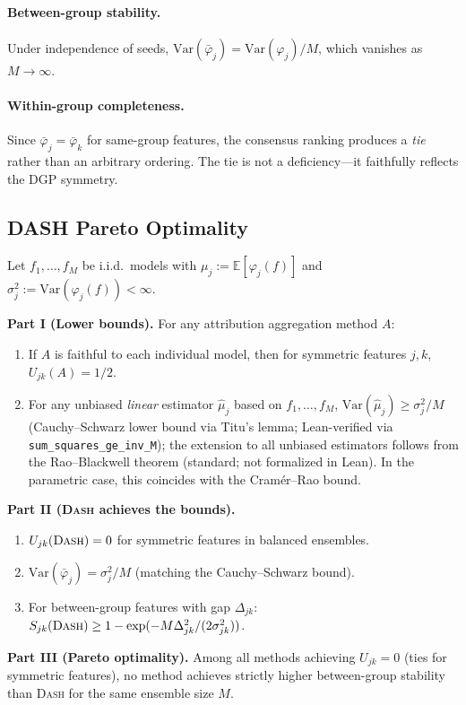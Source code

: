 \documentclass{jmlr}
\newcommand{\E}{\mathbb{E}}
\newcommand{\Var}{\mathrm{Var}}
\newcommand{\DASH}{\textsc{Dash}}
\begin{document}
\paragraph{Between-group stability.}
Under independence of seeds, $\Var(\bar{\varphi}_j) = \Var(\varphi_j) / M$, which vanishes as $M \to \infty$.

\paragraph{Within-group completeness.}
Since $\bar{\varphi}_j = \bar{\varphi}_k$ for same-group features, the consensus ranking produces a \emph{tie} rather than an arbitrary ordering. The tie is not a deficiency---it faithfully reflects the DGP symmetry.

\subsection{DASH Pareto Optimality}
\label{sec:dash-pareto}

\begin{theorem}
\label{thm:dash-optimal}
Let $f_1, \ldots, f_M$ be i.i.d.\ models with $\mu_j := \E[\varphi_j(f)]$ and $\sigma_j^2 := \Var(\varphi_j(f)) < \infty$.

\textbf{Part I (Lower bounds).}
For any attribution aggregation method $A$:
\begin{enumerate}
    \item[(a)] If $A$ is faithful to each individual model, then for symmetric features $j, k$, $U_{jk}(A) = 1/2$.
    \item[(b)] For any unbiased \emph{linear} estimator $\hat\mu_j$ based on $f_1, \ldots, f_M$, $\Var(\hat\mu_j) \geq \sigma_j^2 / M$ (Cauchy--Schwarz lower bound via Titu's lemma; Lean-verified via \texttt{sum\_squares\_ge\_inv\_M}); the extension to all unbiased estimators follows from the Rao--Blackwell theorem (standard; not formalized in Lean). In the parametric case, this coincides with the Cram\'er--Rao bound.
\end{enumerate}

\textbf{Part II (\DASH{} achieves the bounds).}
\begin{enumerate}
    \item[(c)] $U_{jk}(\text{\DASH{}}) = 0$ for symmetric features in balanced ensembles.
    \item[(d)] $\Var(\bar\varphi_j) = \sigma_j^2 / M$ (matching the Cauchy--Schwarz bound).
    \item[(e)] For between-group features with gap $\Delta_{jk}$: $S_{jk}(\text{\DASH{}}) \geq 1 - \exp(-M\Delta_{jk}^2 / (2\sigma_{jk}^2))$.
\end{enumerate}

\textbf{Part III (Pareto optimality).}
Among all methods achieving $U_{jk} = 0$ (ties for symmetric features), no method achieves strictly higher between-group stability than \DASH{} for the same ensemble size $M$.
\end{theorem}
\end{document}
